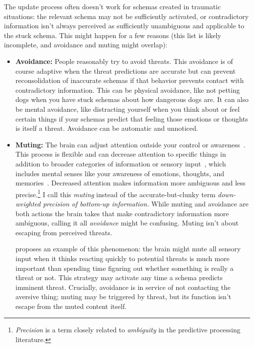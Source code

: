 \documentclass[11pt,oneside]{book}
\let\cite\parencite
\begin{document}
\label{attention}
The update process often doesn't work for schemas created in traumatic situations: the relevant schema may not be sufficiently activated, or contradictory information isn't always perceived as sufficiently unambiguous and applicable to the stuck schema. This might happen for a few reasons (this list is likely incomplete, and avoidance and muting might overlap):
\begin{itemize}
    \item \textbf{Avoidance:} People reasonably try to avoid threats. This avoidance is of course adaptive when the threat predictions are accurate but can prevent reconsolidation of inaccurate schemas if that behavior prevents contact with contradictory information. This can be physical avoidance, like not petting dogs when you have stuck schemas about how dangerous dogs are. It can also be mental avoidance, like distracting yourself when you think about or feel certain things if your schemas predict that feeling those emotions or thoughts is itself a threat. Avoidance can be automatic and unnoticed.
    \item \textbf{Muting:} The brain can adjust attention outside your control or awareness~\cite{clark2015surfing}. This process is flexible and can decrease attention to specific things in addition to broader categories of information or sensory input~\cite{clark2015surfing}, which includes mental senses like your awareness of emotions, thoughts, and memories~\cite{berghBSTS}. Decreased attention makes information more ambiguous and less precise.\footnote{\textit{Precision} is a term closely related to \textit{ambiguity} in the predictive processing literature.} I call this \textit{muting} instead of the accurate-but-clunky term \textit{down-weighted precision of bottom-up information.} While muting and avoidance are both actions the brain takes that make contradictory information more ambiguous, calling it all \textit{avoidance} might be confusing. Muting isn't about escaping from perceived threats.

    \textcite{berghBSTS} proposes an example of this phenomenon: the brain might mute all sensory input when it thinks reacting quickly to potential threats is much more important than spending time figuring out whether something is really a threat or not. This strategy may activate any time a schema predicts imminent threat. Crucially, avoidance is in service of not contacting the aversive thing; muting may be triggered by threat, but its function isn't escape from the muted content itself.


\end{itemize}
\end{document}
